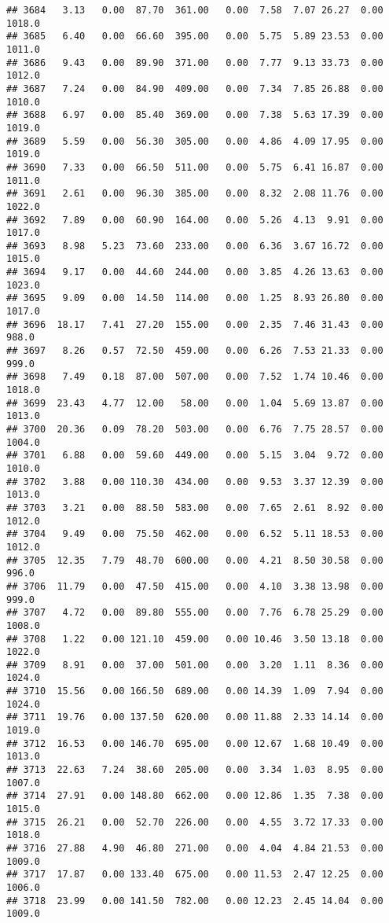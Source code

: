 \documentclass{article}\usepackage{graphicx, color}
\makeatletter
\newenvironment{kframe}{%
 \def\at@end@of@kframe{}%
 \ifinner\ifhmode%
  \def\at@end@of@kframe{\end{minipage}}%
  \begin{minipage}{\columnwidth}%
 \fi\fi%
 \def\FrameCommand##1{\hskip\@totalleftmargin \hskip-\fboxsep
 \colorbox{shadecolor}{##1}\hskip-\fboxsep
     \hskip-\linewidth \hskip-\@totalleftmargin \hskip\columnwidth}%
 \MakeFramed {\advance\hsize-\width
   \@totalleftmargin\z@ \linewidth\hsize
   \@setminipage}}%
 {\par\unskip\endMakeFramed%
 \at@end@of@kframe}
\newenvironment{knitrout}{}{} %
\makeatother
\begin{document}
\begin{knitrout}
\begin{kframe}
\begin{verbatim}
## 3684   3.13   0.00  87.70  361.00   0.00  7.58  7.07 26.27  0.00 1018.0
## 3685   6.40   0.00  66.60  395.00   0.00  5.75  5.89 23.53  0.00 1011.0
## 3686   9.43   0.00  89.90  371.00   0.00  7.77  9.13 33.73  0.00 1012.0
## 3687   7.24   0.00  84.90  409.00   0.00  7.34  7.85 26.88  0.00 1010.0
## 3688   6.97   0.00  85.40  369.00   0.00  7.38  5.63 17.39  0.00 1019.0
## 3689   5.59   0.00  56.30  305.00   0.00  4.86  4.09 17.95  0.00 1019.0
## 3690   7.33   0.00  66.50  511.00   0.00  5.75  6.41 16.87  0.00 1011.0
## 3691   2.61   0.00  96.30  385.00   0.00  8.32  2.08 11.76  0.00 1022.0
## 3692   7.89   0.00  60.90  164.00   0.00  5.26  4.13  9.91  0.00 1017.0
## 3693   8.98   5.23  73.60  233.00   0.00  6.36  3.67 16.72  0.00 1015.0
## 3694   9.17   0.00  44.60  244.00   0.00  3.85  4.26 13.63  0.00 1023.0
## 3695   9.09   0.00  14.50  114.00   0.00  1.25  8.93 26.80  0.00 1017.0
## 3696  18.17   7.41  27.20  155.00   0.00  2.35  7.46 31.43  0.00  988.0
## 3697   8.26   0.57  72.50  459.00   0.00  6.26  7.53 21.33  0.00  999.0
## 3698   7.49   0.18  87.00  507.00   0.00  7.52  1.74 10.46  0.00 1018.0
## 3699  23.43   4.77  12.00   58.00   0.00  1.04  5.69 13.87  0.00 1013.0
## 3700  20.36   0.09  78.20  503.00   0.00  6.76  7.75 28.57  0.00 1004.0
## 3701   6.88   0.00  59.60  449.00   0.00  5.15  3.04  9.72  0.00 1010.0
## 3702   3.88   0.00 110.30  434.00   0.00  9.53  3.37 12.39  0.00 1013.0
## 3703   3.21   0.00  88.50  583.00   0.00  7.65  2.61  8.92  0.00 1012.0
## 3704   9.49   0.00  75.50  462.00   0.00  6.52  5.11 18.53  0.00 1012.0
## 3705  12.35   7.79  48.70  600.00   0.00  4.21  8.50 30.58  0.00  996.0
## 3706  11.79   0.00  47.50  415.00   0.00  4.10  3.38 13.98  0.00  999.0
## 3707   4.72   0.00  89.80  555.00   0.00  7.76  6.78 25.29  0.00 1008.0
## 3708   1.22   0.00 121.10  459.00   0.00 10.46  3.50 13.18  0.00 1022.0
## 3709   8.91   0.00  37.00  501.00   0.00  3.20  1.11  8.36  0.00 1024.0
## 3710  15.56   0.00 166.50  689.00   0.00 14.39  1.09  7.94  0.00 1024.0
## 3711  19.76   0.00 137.50  620.00   0.00 11.88  2.33 14.14  0.00 1019.0
## 3712  16.53   0.00 146.70  695.00   0.00 12.67  1.68 10.49  0.00 1013.0
## 3713  22.63   7.24  38.60  205.00   0.00  3.34  1.03  8.95  0.00 1007.0
## 3714  27.91   0.00 148.80  662.00   0.00 12.86  1.35  7.38  0.00 1015.0
## 3715  26.21   0.00  52.70  226.00   0.00  4.55  3.72 17.33  0.00 1018.0
## 3716  27.88   4.90  46.80  271.00   0.00  4.04  4.84 21.53  0.00 1009.0
## 3717  17.87   0.00 133.40  675.00   0.00 11.53  2.47 12.25  0.00 1006.0
## 3718  23.99   0.00 141.50  782.00   0.00 12.23  2.45 14.04  0.00 1009.0

\end{verbatim}
\end{kframe}
\end{knitrout}
\end{document}
